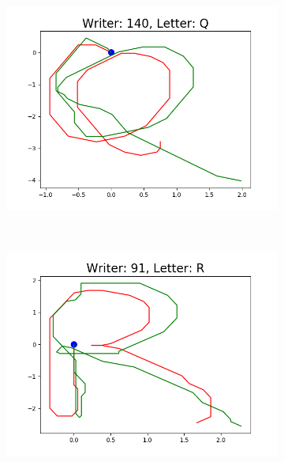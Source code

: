 \begin{figure}
\begin{subfigure}[b]{0.17\textwidth}
          \includegraphics[width=\textwidth]{images/framework/comparison_figures/Q_140.png}
      \end{subfigure}
      ~
      \begin{subfigure}[b]{0.17\textwidth}
          \includegraphics[width=\textwidth]{images/framework/comparison_figures/R_91.png}
      \end{subfigure}
      ~
      \begin{subfigure}[b]{0.17\textwidth}

\end{subfigure}
\end{figure}
